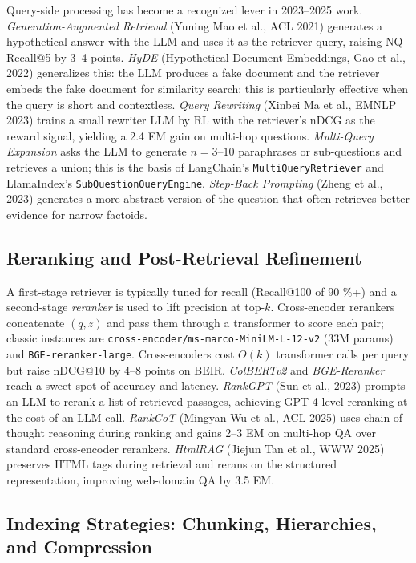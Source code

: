 \documentclass{article}
\begin{document}
Query-side processing has become a recognized lever in 2023--2025 work. \emph{Generation-Augmented Retrieval} (Yuning Mao et al., ACL 2021) generates a hypothetical answer with the LLM and uses it as the retriever query, raising NQ Recall@5 by 3--4 points. \emph{HyDE} (Hypothetical Document Embeddings, Gao et al., 2022) generalizes this: the LLM produces a fake document and the retriever embeds the fake document for similarity search; this is particularly effective when the query is short and contextless. \emph{Query Rewriting} (Xinbei Ma et al., EMNLP 2023) trains a small rewriter LLM by RL with the retriever's nDCG as the reward signal, yielding a 2.4 EM gain on multi-hop questions. \emph{Multi-Query Expansion} asks the LLM to generate \(n=3\)--\(10\) paraphrases or sub-questions and retrieves a union; this is the basis of LangChain's \texttt{MultiQueryRetriever} and LlamaIndex's \texttt{SubQuestionQueryEngine}. \emph{Step-Back Prompting} (Zheng et al., 2023) generates a more abstract version of the question that often retrieves better evidence for narrow factoids.

\subsection{Reranking and Post-Retrieval Refinement}\label{reranking-and-post-retrieval-refinement}

A first-stage retriever is typically tuned for recall (Recall@100 of 90 \%+) and a second-stage \emph{reranker} is used to lift precision at top-\(k\). Cross-encoder rerankers concatenate \((q, z)\) and pass them through a transformer to score each pair; classic instances are \texttt{cross-encoder/ms-marco-MiniLM-L-12-v2} (33M params) and \texttt{BGE-reranker-large}. Cross-encoders cost \(O(k)\) transformer calls per query but raise nDCG@10 by 4--8 points on BEIR. \emph{ColBERTv2} and \emph{BGE-Reranker} reach a sweet spot of accuracy and latency. \emph{RankGPT} (Sun et al., 2023) prompts an LLM to rerank a list of retrieved passages, achieving GPT-4-level reranking at the cost of an LLM call. \emph{RankCoT} (Mingyan Wu et al., ACL 2025) uses chain-of-thought reasoning during ranking and gains 2--3 EM on multi-hop QA over standard cross-encoder rerankers. \emph{HtmlRAG} (Jiejun Tan et al., WWW 2025) preserves HTML tags during retrieval and rerans on the structured representation, improving web-domain QA by 3.5 EM.

\subsection{Indexing Strategies: Chunking, Hierarchies, and Compression}\label{indexing-strategies-chunking-hierarchies-and-compression}
\end{document}
